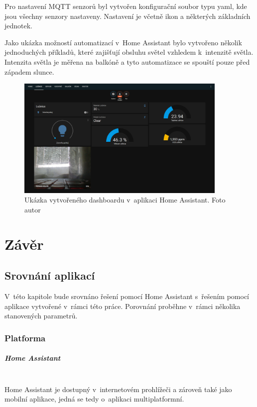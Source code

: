 Pro nastavení MQTT senzorů byl vytvořen konfigurační soubor typu yaml, kde jsou všechny senzory nastaveny. Nastavení je včetně ikon a některých základních jednotek. 

Jako ukázka možností automatizací v~Home Assistant bylo vytvořeno několik jednoduchých příkladů, které zajišťují obsluhu světel vzhledem k~intenzitě světla. Intenzita světla je měřena na balkóně a tyto automatizace se spouští pouze před západem slunce.

\begin{figure}[H]
  \centering
  \includegraphics[width=0.9\textwidth]{obrazky-figures/dashboards/homeAssistantDashboard.PNG}
  \caption{Ukázka vytvořeného dashboardu v~aplikaci Home Assistant. Foto autor}
  \label{hassCreatedDashboard}
\end{figure}

\chapter{Závěr} \label{ending}
\section{Srovnání aplikací}
V~této kapitole bude srovnáno řešení pomocí Home Assistant s~řešením pomocí aplikace vytvořené v~rámci této práce. Porovnání proběhne v~rámci několika stanovených parametrů.

\subsection*{Platforma}
\paragraph*{Home Assistant}\mbox{} \\
Home Assistant je dostupný v~internetovém prohlížeči a zároveň také jako mobilní aplikace, jedná se tedy o~aplikaci multiplatformní.

